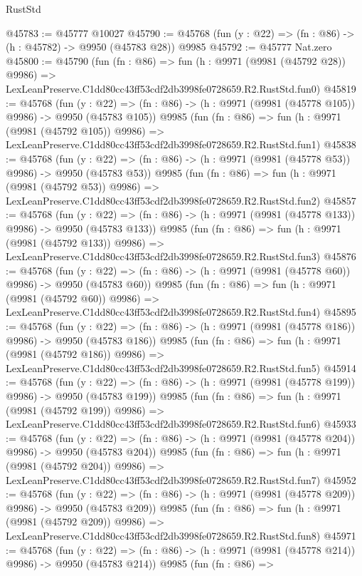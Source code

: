 \begin{lexlean}{RustStd}
\begin{coremodule}
@45783 := @45777 @10027
@45790 := @45768 (fun (y : @22) => (fn : @86) -> (h : @45782) -> @9950 (@45783 @28)) @9985
@45792 := @45777 Nat.zero
@45800 := @45790
    (fun (fn : @86) =>
    fun (h : @9971 (@9981 (@45792 @28)) @9986) =>
    LexLeanPreserve.C1dd80cc43ff53cdf2db3998fe0728659.R2.RustStd.fun0)
@45819 := @45768
    (fun (y : @22) => (fn : @86) -> (h : @9971 (@9981 (@45778 @105)) @9986) -> @9950 (@45783 @105))
    @9985
    (fun (fn : @86) =>
    fun (h : @9971 (@9981 (@45792 @105)) @9986) =>
    LexLeanPreserve.C1dd80cc43ff53cdf2db3998fe0728659.R2.RustStd.fun1)
@45838 := @45768
    (fun (y : @22) => (fn : @86) -> (h : @9971 (@9981 (@45778 @53)) @9986) -> @9950 (@45783 @53))
    @9985
    (fun (fn : @86) =>
    fun (h : @9971 (@9981 (@45792 @53)) @9986) =>
    LexLeanPreserve.C1dd80cc43ff53cdf2db3998fe0728659.R2.RustStd.fun2)
@45857 := @45768
    (fun (y : @22) => (fn : @86) -> (h : @9971 (@9981 (@45778 @133)) @9986) -> @9950 (@45783 @133))
    @9985
    (fun (fn : @86) =>
    fun (h : @9971 (@9981 (@45792 @133)) @9986) =>
    LexLeanPreserve.C1dd80cc43ff53cdf2db3998fe0728659.R2.RustStd.fun3)
@45876 := @45768
    (fun (y : @22) => (fn : @86) -> (h : @9971 (@9981 (@45778 @60)) @9986) -> @9950 (@45783 @60))
    @9985
    (fun (fn : @86) =>
    fun (h : @9971 (@9981 (@45792 @60)) @9986) =>
    LexLeanPreserve.C1dd80cc43ff53cdf2db3998fe0728659.R2.RustStd.fun4)
@45895 := @45768
    (fun (y : @22) => (fn : @86) -> (h : @9971 (@9981 (@45778 @186)) @9986) -> @9950 (@45783 @186))
    @9985
    (fun (fn : @86) =>
    fun (h : @9971 (@9981 (@45792 @186)) @9986) =>
    LexLeanPreserve.C1dd80cc43ff53cdf2db3998fe0728659.R2.RustStd.fun5)
@45914 := @45768
    (fun (y : @22) => (fn : @86) -> (h : @9971 (@9981 (@45778 @199)) @9986) -> @9950 (@45783 @199))
    @9985
    (fun (fn : @86) =>
    fun (h : @9971 (@9981 (@45792 @199)) @9986) =>
    LexLeanPreserve.C1dd80cc43ff53cdf2db3998fe0728659.R2.RustStd.fun6)
@45933 := @45768
    (fun (y : @22) => (fn : @86) -> (h : @9971 (@9981 (@45778 @204)) @9986) -> @9950 (@45783 @204))
    @9985
    (fun (fn : @86) =>
    fun (h : @9971 (@9981 (@45792 @204)) @9986) =>
    LexLeanPreserve.C1dd80cc43ff53cdf2db3998fe0728659.R2.RustStd.fun7)
@45952 := @45768
    (fun (y : @22) => (fn : @86) -> (h : @9971 (@9981 (@45778 @209)) @9986) -> @9950 (@45783 @209))
    @9985
    (fun (fn : @86) =>
    fun (h : @9971 (@9981 (@45792 @209)) @9986) =>
    LexLeanPreserve.C1dd80cc43ff53cdf2db3998fe0728659.R2.RustStd.fun8)
@45971 := @45768
    (fun (y : @22) => (fn : @86) -> (h : @9971 (@9981 (@45778 @214)) @9986) -> @9950 (@45783 @214))
    @9985
    (fun (fn : @86) =>

\end{coremodule}
\end{lexlean}
